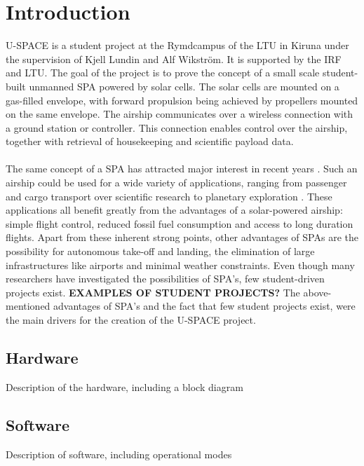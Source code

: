 \newpage
\chapter{Introduction}
\label{chap:introduction}

\ac{U-SPACE} is a student project at the Rymdcampus of the \ac{LTU} in Kiruna under the supervision of Kjell Lundin and Alf Wikström. It is supported by the \ac{IRF} and \ac{LTU}. The goal of the project is to prove the concept of a small scale student-built unmanned \ac{SPA} powered by solar cells. The solar cells are mounted on a gas-filled envelope, with forward propulsion being achieved by propellers mounted on the same envelope. The airship communicates over a wireless connection with a ground station or controller. This connection enables  control over the airship, together with retrieval of housekeeping and scientific payload data.
\\
\\
The same concept of a \ac{SPA} has attracted major interest in recent years \cite{website:ravenaerostar, website:gaya, poster:saba, report:colozza2004}. Such an airship could be used for a wide variety of applications, ranging from passenger and cargo transport \cite{website:gaya} over scientific research \cite{poster:saba} to planetary exploration \cite{report:colozza2004}. These applications all benefit greatly from the advantages of a solar-powered airship: simple flight control, reduced fossil fuel consumption and access to long duration flights. Apart from these inherent strong points, other advantages of \ac{SPA}s are the possibility for autonomous take-off and landing, the elimination of large infrastructures like airports and minimal weather constraints. Even though many researchers have investigated the possibilities of \ac{SPA}'s, few student-driven projects exist. \textbf{EXAMPLES OF STUDENT PROJECTS?} The above-mentioned advantages of \ac{SPA}'s and the fact that few student projects exist, were the main drivers for the creation of the \ac{U-SPACE} project.

\section{Hardware}
\label{sec:intro_hardware}

Description of the hardware, including a block diagram

\section{Software}
\label{sec:intro_software}

Description of software, including operational modes